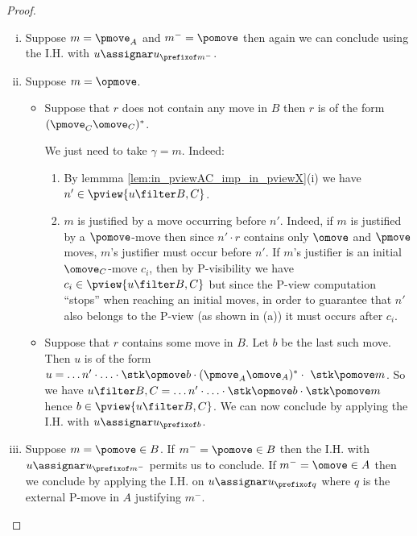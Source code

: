 \begin{proof}
\begin{enumerate}[i.]
\item Suppose $m = \pmove_A$ and $m^- = \pomove$ then again we can conclude using the I.H. with $u \assignar u_{\prefixof m^-}$.

\item Suppose $m = \opmove$.
\begin{itemize}[-]
\item Suppose that $r$ does not contain any move in $B$  then $r$ is of the form $(\pmove_C \omove_C)^*$. 

We just need to take $\gamma = m$. 
Indeed:
\begin{enumerate}
\item By lemmma \ref{lem:in_pviewAC_imp_in_pviewX}(i)
we have $n'\in \pview{u\filter B,C}$.

\item  $m$ is justified by a move occurring before $n'$. 
Indeed, if $m$ is justified by a $\pomove$-move then since $n' \cdot r$ contains only $\omove$ and $\pmove$ moves, $m$'s justifier must occur before $n'$.
If $m$'s justifier is an initial $\omove_C$-move $c_i$, then 
by P-visibility we have $c_i \in \pview{u\filter B,C}$
but since the P-view computation ``stops'' when reaching an initial moves, in order to guarantee that $n'$ also belongs to the P-view (as shown in (a)) it must
occurs after $c_i$.
\end{enumerate}


\item Suppose that $r$ contains some move in $B$. Let $b$ be the last such move. Then $u$ is of the form $u = \ldots n' \cdot \ldots \cdot \stk\opmove  b \cdot (\pmove_A \omove_A)^* \cdot\ \stk\pomove m $. 
So we have
$u\filter B,C = \ldots n' \cdot \ldots \cdot \stk\opmove  b \cdot \stk\pomove m $ hence $b \in \pview{u\filter B,C}$. We can now 
conclude by applying the I.H. with $u \assignar u_{\prefixof b}$.
\end{itemize}

\item Suppose $m = \pomove \in B$.
If $m^- = \pomove \in B$ then the I.H. with $u \assignar u_{\prefixof m^-}$ permits us to conclude.
If $m^- = \omove \in A$ then we conclude by applying the I.H. on $u \assignar u_{\prefixof q}$ where $q$ is the external P-move in $A$ justifying $m^-$.
\end{enumerate}
\end{proof}

